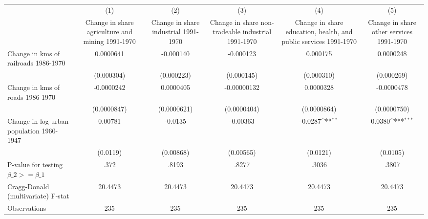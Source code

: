 {
\def\sym#1{\ifmmode^{#1}\else\(^{#1}\)\fi}
\begin{tabular}{l*{5}{c}}
\hline\hline
                &\multicolumn{1}{c}{(1)}&\multicolumn{1}{c}{(2)}&\multicolumn{1}{c}{(3)}&\multicolumn{1}{c}{(4)}&\multicolumn{1}{c}{(5)}\\
                &\multicolumn{1}{c}{Change in share agriculture and mining 1991-1970}&\multicolumn{1}{c}{Change in share industrial 1991-1970}&\multicolumn{1}{c}{Change in share non-tradeable industrial 1991-1970}&\multicolumn{1}{c}{Change in share education, health, and public services 1991-1970}&\multicolumn{1}{c}{Change in share other services 1991-1970}\\
\hline
Change in kms of railroads 1986-1970&0.0000641         &-0.000140         &-0.000123         & 0.000175         &0.0000248         \\
                &(0.000304)         &(0.000223)         &(0.000145)         &(0.000310)         &(0.000269)         \\
[1em]
Change in kms of roads 1986-1970&-0.0000242         &0.0000405         &-0.00000132         &0.0000328         &-0.0000478         \\
                &(0.0000847)         &(0.0000621)         &(0.0000404)         &(0.0000864)         &(0.0000750)         \\
[1em]
Change in log urban population 1960-1947&  0.00781         &  -0.0135         & -0.00363         &  -0.0287\sym{**} &   0.0380\sym{***}\\
                & (0.0119)         &(0.00868)         &(0.00565)         & (0.0121)         & (0.0105)         \\
\hline
P-value for testing $\beta\_{2} >= \beta\_{1}$&     .372         &    .8193         &    .8277         &    .3036         &    .3807         \\
Cragg-Donald (multivariate) F-stat&  20.4473         &  20.4473         &  20.4473         &  20.4473         &  20.4473         \\
Observations    &      235         &      235         &      235         &      235         &      235         \\
\hline\hline
\end{tabular}
}
